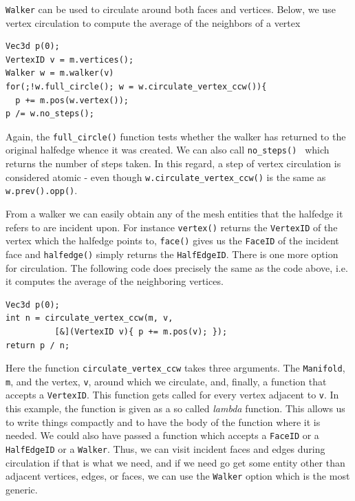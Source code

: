 \documentclass[a4paper]{article}
\begin{document}
\texttt{Walker} can be used to circulate around both faces and vertices. Below, we use vertex circulation to compute the average of the neighbors of a vertex
\begin{verbatim}
Vec3d p(0);
VertexID v = m.vertices();
Walker w = m.walker(v)
for(;!w.full_circle(); w = w.circulate_vertex_ccw()){
  p += m.pos(w.vertex()); 
p /= w.no_steps();
\end{verbatim}

Again, the \texttt{full\_circle()} function tests whether the walker has returned to the original halfedge whence it was created. We can also call  \texttt{no\_steps() } which returns the number of steps taken. In this regard, a step of vertex circulation is considered atomic - even though \texttt{w.circulate\_vertex\_ccw()} is the same as  \texttt{w.prev().opp()}.

From a walker we can easily obtain any of the mesh entities that the halfedge it refers to are incident upon. For instance \texttt{vertex()} returns the \texttt{VertexID} of the vertex which the halfedge points to, \texttt{face()} gives us the \texttt{FaceID} of the incident face and \texttt{halfedge()} simply returns the \texttt{HalfEdgeID}. There is one more option for circulation. The following code does precisely the same as the code above, i.e. it computes the average of the neighboring vertices.
\begin{verbatim}
Vec3d p(0);
int n = circulate_vertex_ccw(m, v, 
          [&](VertexID v){ p += m.pos(v); });
return p / n;
\end{verbatim}
Here the function \texttt{circulate\_vertex\_ccw} takes three arguments. The \texttt{Manifold}, \texttt{m}, and the vertex, \texttt{v}, around which we circulate, and, finally, a function that accepts a \texttt{VertexID}. This function gets called for every vertex adjacent to \texttt{v}. In this example, the function is given as a so called \textit{lambda} function. This allows us to write things compactly and to have the body of the function where it is needed. We could also have passed a function which accepts a \texttt{FaceID} or a \texttt{HalfEdgeID} or a \texttt{Walker}. Thus, we can visit incident faces and edges during circulation if that is what we need, and if we need go get some entity other than adjacent vertices, edges, or faces, we can use the \texttt{Walker} option which is the most generic.
\end{document}
